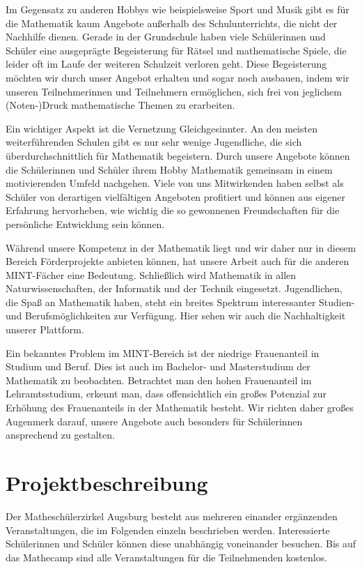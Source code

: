 \documentclass[12pt]{zettel}
\begin{document}
Im Gegensatz zu anderen Hobbys wie beispielsweise Sport und Musik gibt es für die Mathematik kaum Angebote außerhalb des Schulunterrichts, die nicht der Nachhilfe dienen. Gerade in der Grundschule haben viele Schülerinnen und Schüler eine ausgeprägte Begeisterung für
Rätsel und mathematische Spiele, die leider oft im Laufe der weiteren
Schulzeit verloren geht. Diese Begeisterung möchten wir
durch unser Angebot erhalten und sogar noch ausbauen, indem wir
unseren Teilnehmerinnen und Teilnehmern ermöglichen, sich frei von jeglichem
(Noten-)Druck mathematische Themen zu erarbeiten.

Ein wichtiger Aspekt ist die Vernetzung Gleichgesinnter. An
den meisten weiterführenden Schulen gibt es nur sehr wenige Jugendliche, die sich überdurchschnittlich für Mathematik begeistern. Durch unsere Angebote können die
Schülerinnen und Schüler ihrem Hobby Mathematik gemeinsam in einem motivierenden Umfeld nachgehen.  Viele von uns Mitwirkenden haben selbst als Schüler von derartigen vielfältigen Angeboten profitiert und können aus eigener Erfahrung hervorheben, wie wichtig die so gewonnenen Freundschaften für die persönliche Entwicklung sein können.

Während unsere Kompetenz in der Mathematik liegt und wir daher nur in diesem Bereich Förderprojekte anbieten können, hat unsere Arbeit auch für die anderen MINT-Fächer eine Bedeutung. Schließlich wird Mathematik in allen Naturwissenschaften, der Informatik und der Technik eingesetzt. Jugendlichen, die Spaß an Mathematik haben, steht ein breites Spektrum interessanter Studien- und Berufsmöglichkeiten zur Verfügung. Hier sehen wir auch die Nachhaltigkeit unserer Plattform.

Ein bekanntes Problem im MINT-Bereich ist der niedrige Frauenanteil in Studium und Beruf. Dies ist auch im Bachelor- und Masterstudium der Mathematik zu beobachten. Betrachtet man den hohen Frauenanteil im Lehramtsstudium, erkennt man, dass offensichtlich ein großes Potenzial zur Erhöhung des Frauenanteils in der Mathematik besteht. Wir richten daher großes Augenmerk darauf, unsere Angebote auch besonders für Schülerinnen ansprechend zu gestalten.

\section{Projektbeschreibung}

Der Matheschülerzirkel Augsburg besteht aus mehreren einander ergänzenden Veranstaltungen, die im
Folgenden einzeln beschrieben werden. Interessierte Schülerinnen und Schüler
können diese unabhängig voneinander besuchen. Bis auf das Mathecamp sind alle
Veranstaltungen für die Teilnehmenden kostenlos.
\end{document}
